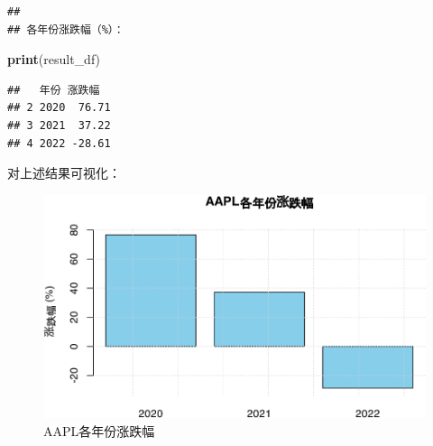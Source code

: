 \documentclass[]{ctexbook}
\newenvironment{Shaded}{\begin{snugshade}}{\end{snugshade}}
\newcommand{\AttributeTok}[1]{\textcolor[rgb]{0.13,0.29,0.53}{#1}}
\newcommand{\CommentTok}[1]{\textcolor[rgb]{0.56,0.35,0.01}{\textit{#1}}}
\newcommand{\ConstantTok}[1]{\textcolor[rgb]{0.56,0.35,0.01}{#1}}
\newcommand{\DecValTok}[1]{\textcolor[rgb]{0.00,0.00,0.81}{#1}}
\newcommand{\FunctionTok}[1]{\textcolor[rgb]{0.13,0.29,0.53}{\textbf{#1}}}
\newcommand{\NormalTok}[1]{#1}
\newcommand{\SpecialCharTok}[1]{\textcolor[rgb]{0.81,0.36,0.00}{\textbf{#1}}}
\newcommand{\StringTok}[1]{\textcolor[rgb]{0.31,0.60,0.02}{#1}}
\begin{document}
\begin{verbatim}
## 
## 各年份涨跌幅（%）：
\end{verbatim}

\begin{Shaded}
\begin{Highlighting}[]
\FunctionTok{print}\NormalTok{(result\_df)}
\end{Highlighting}
\end{Shaded}

\begin{verbatim}
##   年份 涨跌幅
## 2 2020  76.71
## 3 2021  37.22
## 4 2022 -28.61
\end{verbatim}

对上述结果可视化：

\begin{Shaded}
\end{Shaded}

\begin{figure}
\includegraphics[width=0.9\linewidth]{QuantmodHandbook_files/figure-latex/yearreturns-1} \caption{AAPL各年份涨跌幅}\label{fig:yearreturns}
\end{figure}
\end{document}

